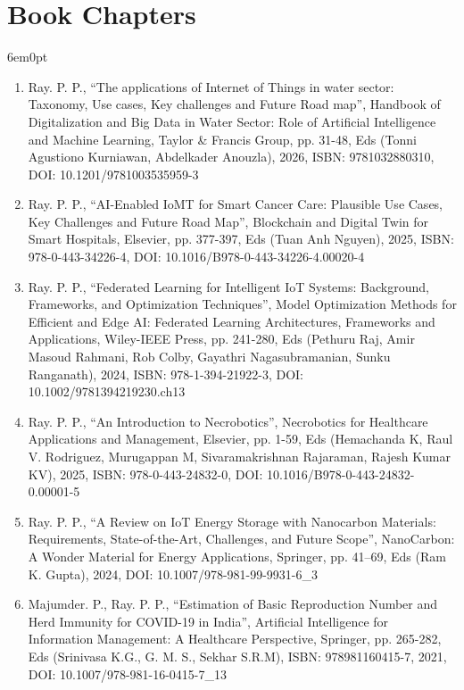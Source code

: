 \documentclass[11pt,a4paper]{moderncv}
\begin{document}
\section{\textbf{Book Chapters}}

\begin{adjustwidth}{6em}{0pt}
	\begin{enumerate}
		
		\item	Ray. P. P., “The applications of Internet of Things in water sector: Taxonomy, Use cases, Key challenges and Future Road map”, Handbook of Digitalization and Big Data in Water Sector: Role of Artificial Intelligence and Machine Learning, Taylor \& Francis Group, pp. 31-48, Eds (Tonni Agustiono Kurniawan, Abdelkader Anouzla), 2026, ISBN: 9781032880310, DOI: 10.1201/9781003535959-3
		
		\item Ray. P. P., “AI-Enabled IoMT for Smart Cancer Care: Plausible Use Cases, Key Challenges and Future Road Map”, Blockchain and Digital Twin for Smart Hospitals, Elsevier, pp. 377-397, Eds (Tuan Anh Nguyen), 2025, ISBN: 978-0-443-34226-4, DOI: 10.1016/B978-0-443-34226-4.00020-4
		
		\item Ray. P. P., “Federated Learning for Intelligent IoT Systems: Background, Frameworks, and Optimization Techniques”, Model Optimization Methods for Efficient and Edge AI: Federated Learning Architectures, Frameworks and Applications, Wiley-IEEE Press, pp. 241-280, Eds (Pethuru Raj, Amir Masoud Rahmani, Rob Colby, Gayathri Nagasubramanian, Sunku Ranganath), 2024, ISBN: 978-1-394-21922-3, DOI: 10.1002/9781394219230.ch13 
		
		\item Ray. P. P., “An Introduction to Necrobotics”, Necrobotics for Healthcare Applications and Management, Elsevier, pp. 1-59, Eds (Hemachanda K, Raul V. Rodriguez, Murugappan M, Sivaramakrishnan Rajaraman, Rajesh Kumar KV), 2025, ISBN: 978-0-443-24832-0, DOI: 10.1016/B978-0-443-24832-0.00001-5
		
		\item Ray. P. P., “A Review on IoT Energy Storage with Nanocarbon Materials: Requirements, State-of-the-Art, Challenges, and Future Scope”, NanoCarbon: A Wonder Material for Energy Applications, Springer, pp. 41–69, Eds (Ram K. Gupta), 2024, DOI: 10.1007/978-981-99-9931-6\_3
		
		\item Majumder. P., Ray. P. P., “Estimation of Basic Reproduction Number and Herd Immunity for COVID-19 in India”, Artificial Intelligence for Information Management: A Healthcare Perspective, Springer, pp. 265-282, Eds (Srinivasa K.G., G. M. S., Sekhar S.R.M), ISBN: 978981160415-7, 2021, DOI: 10.1007/978-981-16-0415-7\_13
		

\end{enumerate}
\end{adjustwidth}
\end{document}
